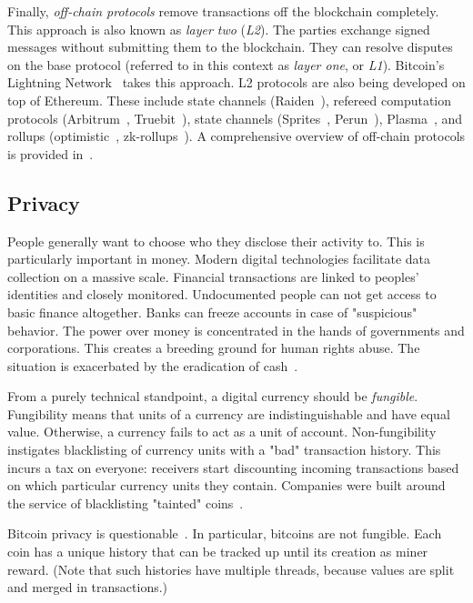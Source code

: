 Finally, \textit{off-chain protocols} remove transactions off the blockchain completely.
This approach is also known as \textit{layer two} (\textit{L2}).
The parties exchange signed messages without submitting them to the blockchain.
They can resolve disputes on the base protocol (referred to in this context as \textit{layer one}, or \textit{L1}).
Bitcoin's Lightning Network~\cite{Poon2016} takes this approach.
L2 protocols are also being developed on top of Ethereum.
These include state channels (Raiden~\cite{RaidenWebsite}), refereed computation protocols (Arbitrum~\cite{Kalodner2018}, Truebit~\cite{Teutsch2017}), state channels (Sprites~\cite{Miller2019}, Perun~\cite{Dziembowski2017}), Plasma~\cite{Poon2017}, and rollups (optimistic~\cite{Floersch2019}, zk-rollups~\cite{Gluchowski2019}).
A comprehensive overview of off-chain protocols is provided in~\cite{Gudgeon2019}.


\subsection{Privacy}

People generally want to choose who they disclose their activity to.
This is particularly important in money.
Modern digital technologies facilitate data collection on a massive scale.
Financial transactions are linked to peoples' identities and closely monitored.
Undocumented people can not get access to basic finance altogether.
Banks can freeze accounts in case of "suspicious" behavior.
The power over money is concentrated in the hands of governments and corporations.
This creates a breeding ground for human rights abuse.
The situation is exacerbated by the eradication of cash~\cite{Brito2019}.

From a purely technical standpoint, a digital currency should be \textit{fungible}.
Fungibility means that units of a currency are indistinguishable and have equal value.
Otherwise, a currency fails to act as a unit of account.
Non-fungibility instigates blacklisting of currency units with a "bad" transaction history.
This incurs a tax on everyone: receivers start discounting incoming transactions based on which particular currency units they contain.
Companies were built around the service of blacklisting "tainted" coins~\cite{Elliptic, Chainalysis}.

Bitcoin privacy is questionable~\cite{Reid2011,Androulaki2013}.
In particular, bitcoins are not fungible.
Each coin has a unique history that can be tracked up until its creation as miner reward.
(Note that such histories have multiple threads, because values are split and merged in transactions.)

